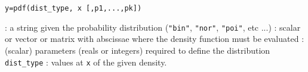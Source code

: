 \begin{mandesc}
\end{mandesc}
\begin{calling_sequence}
\begin{verbatim}
y=pdf(dist_type, x [,p1,...,pk])  
\end{verbatim}
\end{calling_sequence}
\begin{parameters}
  \begin{varlist}
   : a string given the probability distribution (\verb!"bin"!, \verb!"nor"!, \verb!"poi"!, etc ...)
    : scalar or vector or matrix with abscissae where the density function must be evaluated
   : (scalar) parameters (reals or integers) required to define the distribution \verb!dist_type!
   : values at \verb+x+ of the given density.
  \end{varlist}
  \end{parameters}
  
